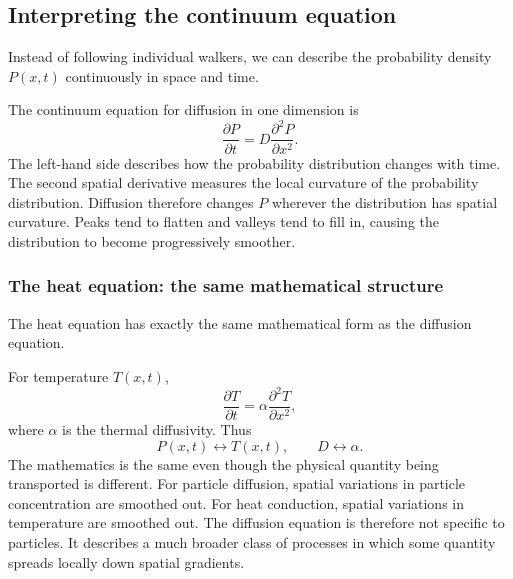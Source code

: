 
\subsection{Interpreting the continuum equation}
\label{sec:curvature}


Instead of following individual walkers, we can describe the probability density $P(x,t)$ continuously in space and time.

The continuum equation for diffusion in one dimension is
% 
\[
    \boxed{\frac{\partial P}{\partial t} = D\frac{\partial^2P}{\partial x^2}.}
\]
% 
The left-hand side describes how the probability distribution changes with time.
The second spatial derivative measures the local curvature of the probability distribution.
Diffusion therefore changes $P$ wherever the distribution has spatial curvature.
Peaks tend to flatten and valleys tend to fill in, causing the distribution to become progressively smoother.



\subsubsection{The heat equation: the same mathematical structure}
\label{sec:heat}


The heat equation has exactly the same mathematical form as the diffusion equation.

For temperature $T(x,t)$,
% 
\[
    \boxed{\frac{\partial T}{\partial t} = \alpha\frac{\partial^2T}{\partial x^2},}
\]
% 
where $\alpha$ is the thermal diffusivity.
Thus
% 
\[
    P(x,t) \longleftrightarrow T(x,t), \qquad D \longleftrightarrow \alpha.
\]
% 
The mathematics is the same even though the physical quantity being transported is different.
For particle diffusion, spatial variations in particle concentration are smoothed out.
For heat conduction, spatial variations in temperature are smoothed out.
The diffusion equation is therefore not specific to particles.
It describes a much broader class of processes in which some quantity spreads locally down spatial gradients.



